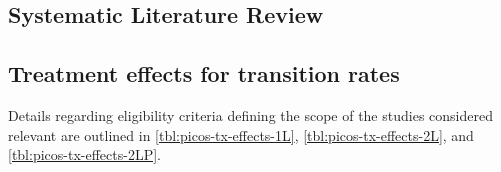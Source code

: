 \documentclass[11pt,final,fleqn]{article}\usepackage[]{graphicx}\usepackage[]{color}
\theoremstyle{plain}
\begin{document}
{\begin{appendices}
\setcounter{table}{0}
\renewcommand{\thetable}{A\arabic{table}}
\setcounter{figure}{0}
\renewcommand{\thefigure}{A\arabic{figure}}
\setcounter{equation}{0}
\renewcommand{\theequation}{A\arabic{equation}}

\section{Systematic Literature Review}\label{app:slr}

\subsection{Treatment effects for transition rates}
Details regarding eligibility criteria defining the scope of the studies considered relevant are outlined in \autoref{tbl:picos-tx-effects-1L}, \autoref{tbl:picos-tx-effects-2L}, and \autoref{tbl:picos-tx-effects-2LP}. 



\end{appendices}}
\end{document}
